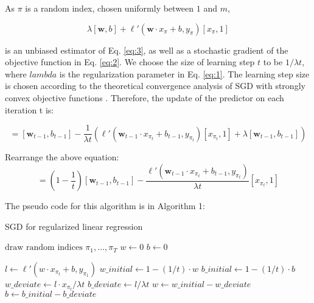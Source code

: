 \noindent As \(\pi\) is a random index, chosen uniformly between \(1\) and \(m\), 

\begin{displaymath}
\lambda [\mathbf{w}, b] + \ell' (\mathbf{w} \cdot x_\pi + b, y_\pi) [x_\pi, 1]
\end{displaymath}

\noindent is an unbiased estimator of Eq. \eqref{eq:3}, as well as a stochastic gradient of the objective function in Eq. \eqref{eq:2}. We choose the size of learning step \(t \) to be \( 1/\lambda t\), where  \(lambda\) is the regularization parameter in Eq. \eqref{eq:1}. The learning step size is chosen according to the theoretical convergence analysis of SGD with strongly convex objective functions \cite{hazan2007logarithmic}. Therefore, the update of the predictor on each iteration t is:

\begin{displaymath}
[\mathbf{w}_t, b_t] = [\mathbf{w}_{t-1},b_{t-1}] - \frac{1}{\lambda t} \left(\ell' (\mathbf{w}_{t-1} \cdot x_{\pi_t} + b_{t-1}, y_{\pi_t}) [x_{\pi_t},1] + \lambda [\mathbf{w}_{t-1}, b_{t-1}]\right) 
\end{displaymath}

\noindent Rearrange the above equation:
\begin{displaymath}
[\mathbf{w}_t, b_t] = \left(1 - \frac{1}{t}\right) \left[\mathbf{w}_{t-1}, b_{t-1}\right] - \frac{\ell' (\mathbf{w}_{t-1} \cdot x_{\pi_t} + b_{t-1}, y_{\pi_t})}{\lambda t} [x_{\pi_t}, 1] \tag{4} \label{eq:4}
\end{displaymath}

\noindent The pseudo code for this algorithm is in Algorithm 1:
\begin{algorithm}
\caption{SGD for regularized linear regression} \label{SGD}
\begin{algorithmic}[1]
 
	\State $\text{draw random indices } \pi_1, \dots, \pi_T$ 
	\State $w \gets 0$
	\State $b \gets 0$
	
		\State $l \gets \ell'(w \cdot x_{\pi_t} + b, y_{\pi_1})$
		\State $w\_initial \gets 1 - (1 / t) \cdot w$
		\State $b\_initial \gets 1 - (1 / t) \cdot b$
		\State $w\_deviate \gets l \cdot x_{\pi_t} / \lambda t $
		\State $b\_deviate \gets l / \lambda t$
		\State $w \gets w\_initial - w\_deviate$
		\State $b \gets b\_initial - b\_deviate$
	\EndFor
	\Return [w, b]
\EndFunction
\end{algorithmic}
\end{algorithm}

